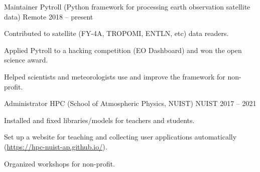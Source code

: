 

\begin{cventries}

  \cventry
    {Maintainer} %
    {Pytroll (Python framework for processing earth observation satellite data)} %
    {Remote} %
    {2018 -- present} %
    {
      \begin{cvitems} %
        \item {Contributed to satellite (FY-4A, TROPOMI, ENTLN, etc) data readers.}
        \item {Applied Pytroll to a hacking competition (EO Dashboard) and won the open science award.}
        \item {Helped scientists and meteorologists use and improve the framework for non-profit.}
      \end{cvitems}
    }

  \cventry
    {Administrator} %
    {HPC (School of Atmospheric Physics, NUIST)} %
    {NUIST} %
    {2017 -- 2021} %
    {
      \begin{cvitems} %
        \item {Installed and fixed libraries/models for teachers and students.}
        \item {Set up a website for teaching and collecting user applications automatically (\url{https://hpc-nuist-ap.github.io/}).}
        \item {Organized workshops for non-profit.}
      \end{cvitems}
    }

\end{cventries}
